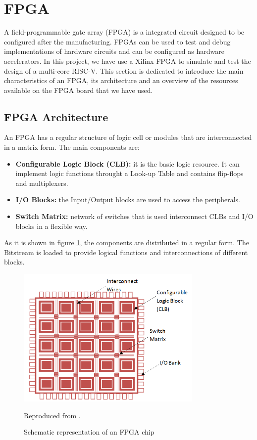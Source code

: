 \section{\gls{FPGA}}

A field-programmable gate array (\gls{FPGA}) is a integrated circuit designed to be configured after the manufacturing. FPGAs can be used to test and debug implementations of hardware circuits and can be configured as hardware accelerators. In this project, we have use a Xilinx \gls{FPGA} to simulate and test the design of a multi-core RISC-V. This section is dedicated to introduce the main characteristics of an \gls{FPGA}, its architecture and an overview of the resources available on the \gls{FPGA} board that we have used.

\subsection{FPGA Architecture}
An FPGA has a regular structure of logic cell or modules that are interconnected in a matrix form. The main components are:

\begin{itemize}
	\item \textbf{Configurable Logic Block (CLB):} it is the basic logic resource. It can implement logic functions throught a Look-up Table and contains flip-flops and multiplexers. 
	\item \textbf{I/O Blocks:} the Input/Output blocks are used to access the peripherals. 
	\item \textbf{Switch Matrix:} network of switches that is used interconnect CLBs and I/O blocks in a flexible way.
\end{itemize}

As it is shown in figure \ref{fig:fpga}, the components are distributed in a regular  form. The Bitstream is loaded to provide logical functions and interconnections of different blocks. 

\begin{figure}[h]
    \centering
    \includegraphics[width=0.8\textwidth]{../presentation/images/FPGA-Architecture.png}
    \caption{Schematic representation of an FPGA chip} Reproduced from \cite{FPGA}.
    \label{fig:fpga}
\end{figure}

